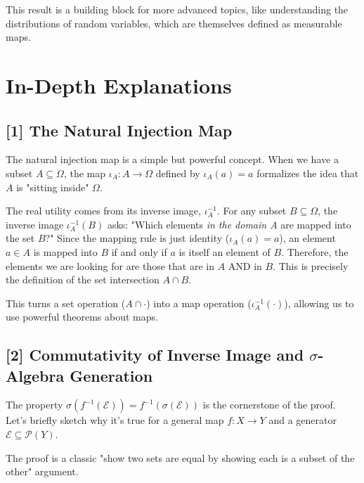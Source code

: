 \documentclass[11pt,a4paper]{article}
\begin{document}
This result is a building block for more advanced topics, like understanding the distributions of random variables, which are themselves defined as measurable maps.

\newpage
\section*{In-Depth Explanations}

\subsection*{[1] The Natural Injection Map}\label{exp3}
The natural injection map is a simple but powerful concept. When we have a subset $A \subseteq \Omega$, the map $\iota_A: A \to \Omega$ defined by $\iota_A(a) = a$ formalizes the idea that $A$ is "sitting inside" $\Omega$.

The real utility comes from its inverse image, $\iota_A^{-1}$. For any subset $B \subseteq \Omega$, the inverse image $\iota_A^{-1}(B)$ asks: "Which elements \emph{in the domain A} are mapped into the set $B$?"
Since the mapping rule is just identity ($\iota_A(a) = a$), an element $a \in A$ is mapped into $B$ if and only if $a$ is itself an element of $B$. Therefore, the elements we are looking for are those that are in $A$ AND in $B$. This is precisely the definition of the set intersection $A \cap B$.

This turns a set operation ($A \cap \cdot$) into a map operation ($\iota_A^{-1}(\cdot)$), allowing us to use powerful theorems about maps.

\subsection*{[2] Commutativity of Inverse Image and $\sigma$-Algebra Generation}\label{exp2}
The property $\sigma(f^{-1}(\mathcal{E})) = f^{-1}(\sigma(\mathcal{E}))$ is the cornerstone of the proof. Let's briefly sketch why it's true for a general map $f: X \to Y$ and a generator $\mathcal{E} \subseteq \mathcal{P}(Y)$.

The proof is a classic "show two sets are equal by showing each is a subset of the other" argument.
\end{document}
